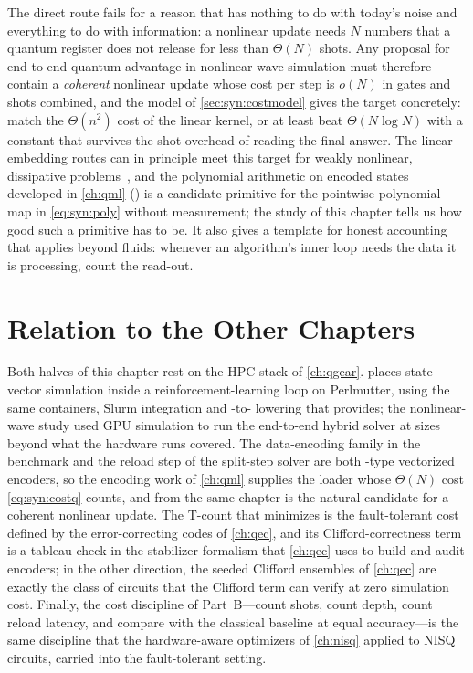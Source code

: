 The direct route fails for a reason that has nothing to do with today's noise and everything to do with information: a nonlinear update needs $N$ numbers that a quantum register does not release for less than $\Theta(N)$ shots. Any proposal for end-to-end quantum advantage in nonlinear wave simulation must therefore contain a \emph{coherent} nonlinear update whose cost per step is $o(N)$ in gates and shots combined, and the model of \cref{sec:syn:costmodel} gives the target concretely: match the $\Theta(n^{2})$ cost of the linear kernel, or at least beat $\Theta(N\log N)$ with a constant that survives the shot overhead of reading the final answer. The linear-embedding routes can in principle meet this target for weakly nonlinear, dissipative problems~\cite{liu2021carleman}, and the polynomial arithmetic on encoded states developed in \cref{ch:qml} (\nnqa{}) is a candidate primitive for the pointwise polynomial map in \cref{eq:syn:poly} without measurement; the study of this chapter tells us how good such a primitive has to be. It also gives a template for honest accounting that applies beyond fluids: whenever an algorithm's inner loop needs the data it is processing, count the read-out.

\section{Relation to the Other Chapters}\label{sec:syn:relation}

Both halves of this chapter rest on the HPC stack of \cref{ch:qgear}. \rubriq{} places \cudaq{} state-vector simulation inside a reinforcement-learning loop on Perlmutter, using the same containers, Slurm integration and \qiskit{}-to-\cudaq{} lowering that \qgear{} provides; the nonlinear-wave study used GPU simulation to run the end-to-end hybrid solver at sizes beyond what the hardware runs covered. The data-encoding family in the \rubriq{} benchmark and the reload step of the split-step solver are both \qcrank{}-type vectorized encoders, so the encoding work of \cref{ch:qml} supplies the loader whose $\Theta(N)$ cost \cref{eq:syn:costq} counts, and \nnqa{} from the same chapter is the natural candidate for a coherent nonlinear update. The T-count that \rubriq{} minimizes is the fault-tolerant cost defined by the error-correcting codes of \cref{ch:qec}, and its Clifford-correctness term is a tableau check in the stabilizer formalism that \cref{ch:qec} uses to build and audit encoders; in the other direction, the seeded Clifford ensembles of \cref{ch:qec} are exactly the class of circuits that the Clifford term can verify at zero simulation cost. Finally, the cost discipline of Part~B---count shots, count depth, count reload latency, and compare with the classical baseline at equal accuracy---is the same discipline that the hardware-aware optimizers of \cref{ch:nisq} applied to NISQ circuits, carried into the fault-tolerant setting.

